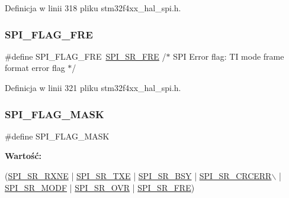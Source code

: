 Definicja w linii 318 pliku stm32f4xx\+\_\+hal\+\_\+spi.\+h.

\mbox{\label{group___s_p_i___flags__definition_ga27dd114d8adc70f1439c054289f9313a}} 
\subsubsection{\texorpdfstring{S\+P\+I\+\_\+\+F\+L\+A\+G\+\_\+\+F\+RE}{SPI\_FLAG\_FRE}}
{\footnotesize\ttfamily \#define S\+P\+I\+\_\+\+F\+L\+A\+G\+\_\+\+F\+RE~\hyperlink{group___peripheral___registers___bits___definition_gace2c7cac9431231663af42e6f5aabce6}{S\+P\+I\+\_\+\+S\+R\+\_\+\+F\+RE}    /$\ast$ S\+PI Error flag\+: TI mode frame format error flag $\ast$/}



Definicja w linii 321 pliku stm32f4xx\+\_\+hal\+\_\+spi.\+h.

\mbox{\label{group___s_p_i___flags__definition_ga1b2ed6861d967c5bc45a7e7c9101d33c}} 
\subsubsection{\texorpdfstring{S\+P\+I\+\_\+\+F\+L\+A\+G\+\_\+\+M\+A\+SK}{SPI\_FLAG\_MASK}}
{\footnotesize\ttfamily \#define S\+P\+I\+\_\+\+F\+L\+A\+G\+\_\+\+M\+A\+SK}

{\bfseries Wartość\+:}
\begin{DoxyCode}
(\hyperlink{group___peripheral___registers___bits___definition_ga40e14de547aa06864abcd4b0422d8b48}{SPI\_SR\_RXNE} | \hyperlink{group___peripheral___registers___bits___definition_ga5bd5d21816947fcb25ccae7d3bf8eb2c}{SPI\_SR\_TXE} | \hyperlink{group___peripheral___registers___bits___definition_gaa3498df67729ae048dc5f315ef7c16bf}{SPI\_SR\_BSY} | 
      \hyperlink{group___peripheral___registers___bits___definition_ga69e543fa9584fd636032a3ee735f750b}{SPI\_SR\_CRCERR}\(\backslash\)
                                         | \hyperlink{group___peripheral___registers___bits___definition_gabaa043349833dc7b8138969c64f63adf}{SPI\_SR\_MODF} | \hyperlink{group___peripheral___registers___bits___definition_gaa8d902302c5eb81ce4a57029de281232}{SPI\_SR\_OVR} | 
      \hyperlink{group___peripheral___registers___bits___definition_gace2c7cac9431231663af42e6f5aabce6}{SPI\_SR\_FRE})
\end{DoxyCode}


